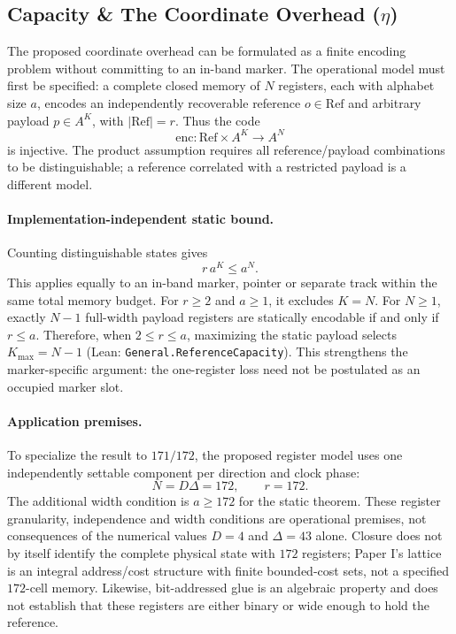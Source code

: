 
\subsection{Capacity \& The Coordinate Overhead (\texorpdfstring{$\eta$}{eta})}
\label{subsec:coordinate_overhead}

The proposed coordinate overhead can be formulated as a finite encoding problem without committing to an in-band marker. The operational model must first be specified: a complete closed memory of $N$ registers, each with alphabet size $a$, encodes an independently recoverable reference $o\in\mathrm{Ref}$ and arbitrary payload $p\in A^K$, with $|\mathrm{Ref}|=r$. Thus the code
\begin{equation}
 \mathrm{enc}:\mathrm{Ref}\times A^K\longrightarrow A^N
\end{equation}
is injective. The product assumption requires all reference/payload combinations to be distinguishable; a reference correlated with a restricted payload is a different model.

\paragraph{Implementation-independent static bound.}
Counting distinguishable states gives
\begin{equation}
 r\,a^K\leq a^N.
\end{equation}
This applies equally to an in-band marker, pointer or separate track within the same total memory budget. For $r\geq2$ and $a\geq1$, it excludes $K=N$. For $N\geq1$, exactly $N-1$ full-width payload registers are statically encodable if and only if $r\leq a$. Therefore, when $2\leq r\leq a$, maximizing the static payload selects $K_{\max}=N-1$ (Lean: \texttt{General.ReferenceCapacity}). This strengthens the marker-specific argument: the one-register loss need not be postulated as an occupied marker slot.

\paragraph{Application premises.}
To specialize the result to $171/172$, the proposed register model uses one independently settable component per direction and clock phase:
\begin{equation}
 N=D\Delta=172,\qquad r=172.
\end{equation}
The additional width condition is $a\geq172$ for the static theorem. These register granularity, independence and width conditions are operational premises, not consequences of the numerical values $D=4$ and $\Delta=43$ alone. Closure does not by itself identify the complete physical state with $172$ registers; Paper I's lattice is an integral address/cost structure with finite bounded-cost sets, not a specified $172$-cell memory. Likewise, bit-addressed glue is an algebraic property and does not establish that these registers are either binary or wide enough to hold the reference.

